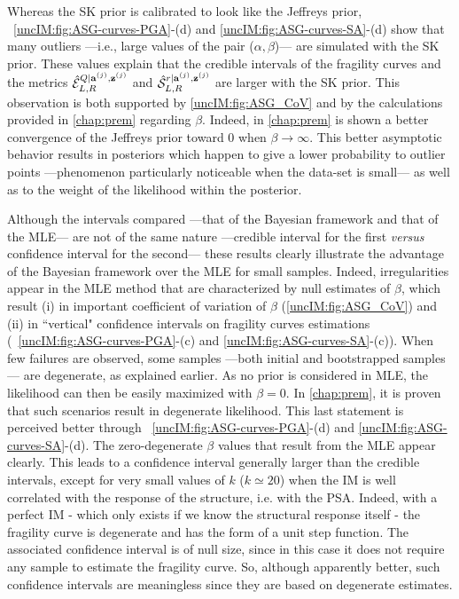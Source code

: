   Whereas the SK prior is calibrated to look like the Jeffreys prior, ~\ref{uncIM:fig:ASG-curves-PGA}-(d) and \ref{uncIM:fig:ASG-curves-SA}-(d) show that many outliers ---i.e., large values of the pair ($\alpha,\beta$)--- are simulated with the SK prior. These values explain that the credible intervals of the fragility curves and the metrics $\hat{\mathcal{E}}_{L,R}^{Q|\mathbf{a}^{(j)},\mathbf{z}^{(j)}}$ and $\hat{\mathcal{S}}_{L,R}^{r|\mathbf{a}^{(j)},\mathbf{z}^{(j)}}$ are larger with the SK prior. This observation is both supported by \cref{uncIM:fig:ASG_CoV} and by the calculations provided in \cref{chap:prem} regarding $\beta$. Indeed, in \cref{chap:prem} is shown a better convergence of the Jeffreys prior toward $0$ when $\beta\to\infty$. This better  asymptotic behavior results in posteriors which happen to give a lower probability to outlier points  ---phenomenon particularly noticeable when the data-set is small--- as well as to the weight of the likelihood within the posterior.
  
  Although the intervals compared ---that of the Bayesian framework and that of the MLE--- are not of the same nature ---credible interval for the first \emph{versus} confidence interval for the second--- these results clearly illustrate the advantage of the Bayesian framework over the MLE for small samples. Indeed, irregularities appear in the MLE method that are characterized by null estimates of $\beta$, which result (i) in important coefficient of variation of $\beta$  (\cref{uncIM:fig:ASG_CoV}) and (ii) in ``vertical" confidence intervals on fragility curves estimations (~\ref{uncIM:fig:ASG-curves-PGA}-(c) and \ref{uncIM:fig:ASG-curves-SA}-(c)). {When few failures are observed, some samples ---both initial and bootstrapped samples--- are degenerate, as explained earlier.} As no prior is considered in MLE, the likelihood can then be easily maximized with $\beta=0$. In \cref{chap:prem}, it is proven that such scenarios result in degenerate likelihood. This last statement is perceived better through ~\ref{uncIM:fig:ASG-curves-PGA}-(d) and \ref{uncIM:fig:ASG-curves-SA}-(d). The zero-degenerate $\beta$ values that result from the MLE appear clearly. This leads to a confidence interval generally larger than the credible intervals, except for very small values of $k$ ($k \simeq 20$) when the IM is well correlated with the response of the structure, i.e. with the PSA. Indeed, with a perfect IM - which only exists if we know the structural response itself - the fragility curve is degenerate and has the form of a unit step function. The associated confidence interval is of null size, since in this case it does not require any sample to estimate the fragility curve. So, although apparently better, such confidence intervals are meaningless since they are based on degenerate estimates.
  

